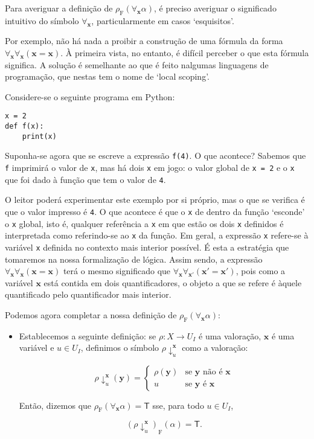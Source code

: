 \documentclass{report}
\theoremstyle{definition}
\theoremstyle{remark}
\renewcommand{\bf}[1]{\mathbf{#1}}
\newcommand{\F}{\mathrm{F}}
\newcommand{\lt}{\mathsf{T}}
\begin{document}
	Para averiguar a definição de $\rho_\F(\forall_{\bf x} \alpha)$, é preciso averiguar o significado intuitivo do símbolo $\forall_{\bf x}$, particularmente em casos `esquisitos'.
	
	Por exemplo, não há nada a proibir a construção de uma fórmula da forma $\forall_{\bf x} \forall_{\bf x} (\bf x = \bf x)$. À primeira vista, no entanto, é difícil perceber o que esta fórmula significa. A solução é semelhante ao que é feito nalgumas linguagens de programação, que nestas tem o nome de `local scoping'.
	
	Considere-se o seguinte programa em Python:
	
	\begin{lstlisting}
x = 2
def f(x):
    print(x)
	\end{lstlisting}
	Suponha-se agora que se escreve a expressão \texttt{f(4)}. O que acontece? Sabemos que \texttt{f} imprimirá o valor de \texttt{x}, mas há dois \texttt{x} em jogo: o valor global de \texttt{x = 2} e o \texttt{x} que foi dado à função que tem o valor de \texttt{4}.
	
	O leitor poderá experimentar este exemplo por si próprio, mas o que se verifica é que o valor impresso é \texttt{4}. O que acontece é que o \texttt{x} de dentro da função `esconde' o \texttt{x} global, isto é, qualquer referência a \texttt{x} em que estão os dois \texttt{x} definidos é interpretada como referindo-se ao \texttt{x} da função. Em geral, a expressão \texttt{x} refere-se à variável \texttt{x} definida no contexto mais interior possível. É esta a estratégia que tomaremos na nossa formalização de lógica. Assim sendo, a expressão $\forall_{\bf x} \forall_{\bf x} (\bf x = \bf x)$ terá o mesmo significado que $\forall_{\bf x} \forall_{\bf x'} (\bf x' = \bf x')$, pois como a variável $\bf x$ está contida em dois quantificadores, o objeto a que se refere é àquele quantificado pelo quantificador mais interior.
	
	Podemos agora completar a nossa definição de $\rho_\F(\forall_{\bf x} \alpha)$:
	
	\begin{itemize}
	\item Establecemos a seguinte definição: se $\rho : X \to U_I$ é uma valoração, $\bf x$ é uma variável e $u \in U_I$, definimos o símbolo $\rho\!\downarrow^{\bf x}_u$ como a valoração:
	
	\[\rho\!\downarrow^{\bf x}_u (\bf y) = \begin{cases}
	\rho(\bf y) & \text{se $\bf y$ não é $\bf x$}\\
	u & \text{se $\bf y$ é $\bf x$}
	\end{cases}\]
	
	Então, dizemos que $\rho_\F(\forall_{\bf x} \alpha) = \lt$ sse, para todo $u \in U_I$,
	
	\[(\rho\!\downarrow^{\bf x}_u)_\F(\alpha) = \lt.\]
	\end{itemize}
	
\end{document}
